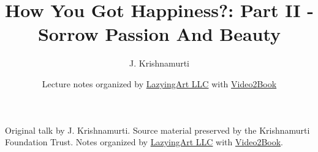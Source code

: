 \documentclass[11pt,oneside]{book}
\begin{document}
\frontmatter
\title{How You Got Happiness?: Part II - Sorrow Passion And Beauty}
\author{J. Krishnamurti}
\date{Lecture notes organized by \href{https://lazying.art}{LazyingArt LLC} with \href{https://github.com/lachlanchen/Video2Book}{Video2Book}}
\maketitle
\begin{center}
\small Original talk by J. Krishnamurti. Source material preserved by the Krishnamurti Foundation Trust. Notes organized by \href{https://lazying.art}{LazyingArt LLC} with \href{https://github.com/lachlanchen/Video2Book}{Video2Book}.
\end{center}
\clearpage
\mainmatter

\end{document}
